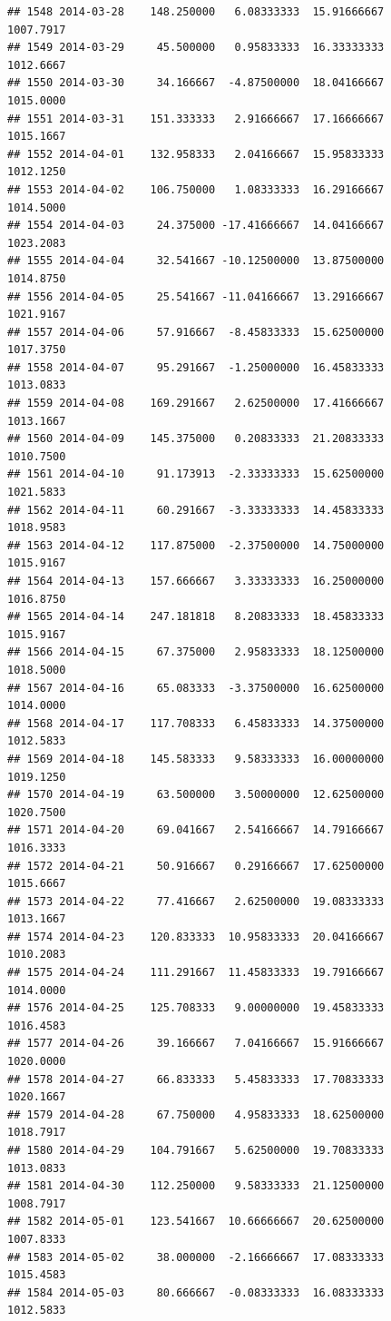 \documentclass[
]{article}
\begin{document}
\begin{verbatim}
## 1548 2014-03-28    148.250000   6.08333333  15.91666667    1007.7917
## 1549 2014-03-29     45.500000   0.95833333  16.33333333    1012.6667
## 1550 2014-03-30     34.166667  -4.87500000  18.04166667    1015.0000
## 1551 2014-03-31    151.333333   2.91666667  17.16666667    1015.1667
## 1552 2014-04-01    132.958333   2.04166667  15.95833333    1012.1250
## 1553 2014-04-02    106.750000   1.08333333  16.29166667    1014.5000
## 1554 2014-04-03     24.375000 -17.41666667  14.04166667    1023.2083
## 1555 2014-04-04     32.541667 -10.12500000  13.87500000    1014.8750
## 1556 2014-04-05     25.541667 -11.04166667  13.29166667    1021.9167
## 1557 2014-04-06     57.916667  -8.45833333  15.62500000    1017.3750
## 1558 2014-04-07     95.291667  -1.25000000  16.45833333    1013.0833
## 1559 2014-04-08    169.291667   2.62500000  17.41666667    1013.1667
## 1560 2014-04-09    145.375000   0.20833333  21.20833333    1010.7500
## 1561 2014-04-10     91.173913  -2.33333333  15.62500000    1021.5833
## 1562 2014-04-11     60.291667  -3.33333333  14.45833333    1018.9583
## 1563 2014-04-12    117.875000  -2.37500000  14.75000000    1015.9167
## 1564 2014-04-13    157.666667   3.33333333  16.25000000    1016.8750
## 1565 2014-04-14    247.181818   8.20833333  18.45833333    1015.9167
## 1566 2014-04-15     67.375000   2.95833333  18.12500000    1018.5000
## 1567 2014-04-16     65.083333  -3.37500000  16.62500000    1014.0000
## 1568 2014-04-17    117.708333   6.45833333  14.37500000    1012.5833
## 1569 2014-04-18    145.583333   9.58333333  16.00000000    1019.1250
## 1570 2014-04-19     63.500000   3.50000000  12.62500000    1020.7500
## 1571 2014-04-20     69.041667   2.54166667  14.79166667    1016.3333
## 1572 2014-04-21     50.916667   0.29166667  17.62500000    1015.6667
## 1573 2014-04-22     77.416667   2.62500000  19.08333333    1013.1667
## 1574 2014-04-23    120.833333  10.95833333  20.04166667    1010.2083
## 1575 2014-04-24    111.291667  11.45833333  19.79166667    1014.0000
## 1576 2014-04-25    125.708333   9.00000000  19.45833333    1016.4583
## 1577 2014-04-26     39.166667   7.04166667  15.91666667    1020.0000
## 1578 2014-04-27     66.833333   5.45833333  17.70833333    1020.1667
## 1579 2014-04-28     67.750000   4.95833333  18.62500000    1018.7917
## 1580 2014-04-29    104.791667   5.62500000  19.70833333    1013.0833
## 1581 2014-04-30    112.250000   9.58333333  21.12500000    1008.7917
## 1582 2014-05-01    123.541667  10.66666667  20.62500000    1007.8333
## 1583 2014-05-02     38.000000  -2.16666667  17.08333333    1015.4583
## 1584 2014-05-03     80.666667  -0.08333333  16.08333333    1012.5833

\end{verbatim}
\end{document}
